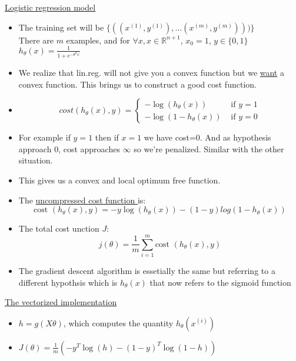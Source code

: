\documentclass[12pt]{article}
\begin{document}
\underline{Logistic regression model}
\begin{itemize}
	
	\item The training set will be $\{((x^{(1)},y^{(1)}), \ldots (x^{(m)},y^{(m)})))\}$\\
	There are $m$ examples, and for $\forall x, x\in \mathbb{R}^{n+1}$, $x_0=1$, $y\in\{0,1\}$\\
	$h_\theta(x) = \frac{1}{1 + e^{-\theta^Tx}}$
	\item We realize that lin.reg. will not give you a convex function but we \underline{want} a convex function. This brings us to construct a good cost function.
	\item 
	 \[
	cost(h_\theta(x),y)=\left\{
	\begin{array}{ll}
	-\log(h_\theta(x)) &\text{ if }y=1\\
	-\log(1-h_\theta(x))& \text{ if }y=0
	\end{array}
	\right.
	\]
	\item For example if $y=1$ then if $x=1$ we have cost=$0$. And as hypothesis approach $0$, cost approaches $\infty$ so we're penalized. Similar with the other situation.
	\item This gives us a convex and local optimum free function.
	\item The \underline{uncompressed cost function } is:
	\[\text{cost } (h_\theta(x),y) = -y\log(h_\theta(x))-(1-y)log(1-h_\theta(x))\]
	\item The total cost unction $J$:
	\[j(\theta) = \frac{1}{m}\sum_{i=1}^{m} \text{cost } (h_\theta(x),y) \]
	\item The gradient descent algorithm is essetially the same but referring to a different hypothsis which is $h_\theta(x)$ that now refers to the sigmoid function\\
	\end{itemize}

\underline{The vectorized implementation}

\begin{itemize}
	\item $h=g(X\theta)$, which computes the quantity $h_\theta(x^{(i)})$
	\item
	$J(\theta) = \frac{1}{m}(-y^T\log(h)-(1-y)^T\log(1-h))$
\end{itemize}
\end{document}
